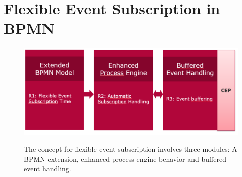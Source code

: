 \chapter{Flexible Event Subscription in BPMN}\label{ch:flexibleeventsubscription}


\begin{figure}[]
	\myfloatalign
	{\includegraphics[width=1\linewidth]{chapters/concept/concept-modules.PNG}}
	\caption{The concept for flexible event subscription involves three modules: A BPMN extension, enhanced process engine behavior and buffered event handling.}\label{fig:concept-modules}
\end{figure}




